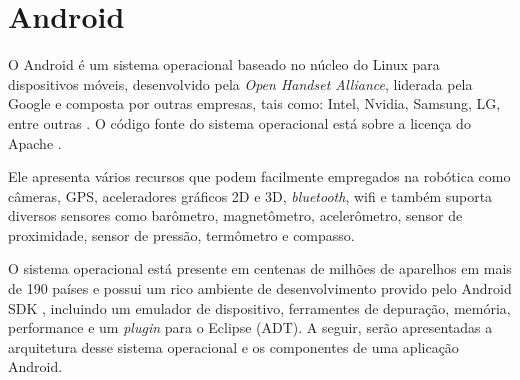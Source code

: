 \chapter{Android}
\label{android}

O Android é um sistema operacional baseado no núcleo do Linux para dispositivos móveis, 
desenvolvido pela \textit{Open Handset Alliance}, liderada pela Google e composta por
outras empresas, tais como: Intel, Nvidia, Samsung, LG, entre outras \cite{android0}. 
O código fonte do sistema operacional está sobre a licença do Apache \cite{apacheLicence}. 

Ele apresenta vários recursos que podem facilmente empregados na robótica como
câmeras, GPS, aceleradores gráficos 2D e 3D, \textit{bluetooth}, wifi e também
suporta diversos sensores como barômetro, magnetômetro, acelerômetro, 
 sensor de proximidade, sensor de pressão, termômetro e compasso. 
 
 O sistema operacional está presente em centenas 
de milhões de aparelhos em mais de 190 países \cite{androidDev} e possui um rico
ambiente de desenvolvimento provido pelo Android SDK \cite{sdk}, incluindo um emulador de dispositivo, 
ferramentes de depuração, memória, performance e um \textit{plugin} para o Eclipse (ADT). 
A seguir, serão apresentadas a arquitetura desse sistema operacional 
e os componentes de uma aplicação Android.

\clearpage

